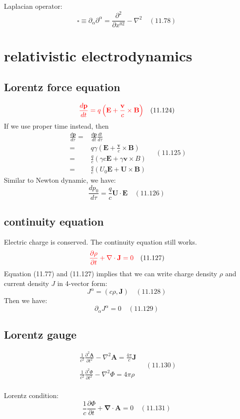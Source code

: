 \documentclass[10pt, oneside]{article}   	%
\begin{document}
\begin{multicols}{2}
Laplacian operator:\\
$$\square \equiv \partial_{\alpha} \partial^{\alpha}=\frac{\partial^{2}}{\partial x^{02}}-\nabla^{2}\quad(11.78)$$

\section{relativistic electrodynamics}
\subsection{Lorentz force equation}
$$\textcolor{red}{\frac{d \mathbf{p}}{d t}=q\left(\mathbf{E}+\frac{\mathbf{v}}{c} \times \mathbf{B}\right)}\quad(11.124)$$
If we use proper time instead, then\\
$$\begin{aligned}
\frac{d \mathbf{p}}{d \tau}=&\frac{d \mathbf{p}}{d t}\frac{d t}{d \tau}\\
=&q\gamma \left(\mathbf{E}+\frac{\mathbf{v}}{c} \times \mathbf{B}\right)\\
=&\frac{q}{c}(\gamma c \mathbf{E}+\gamma \mathbf{v}\times B)\\
=&\frac{q}{c}\left(U_{0} \mathbf{E}+\mathbf{U} \times \mathbf{B}\right)
\end{aligned}\quad(11.125)$$
Similar to Newton dynamic, we have:
$$\frac{d p_{0}}{d \tau}=\frac{q}{c} \mathbf{U} \cdot \mathbf{E}\quad(11.126)$$

\subsection{continuity equation}
Electric charge is conserved. The continuity equation still works.
$$\textcolor{red}{\frac{\partial \rho}{\partial t}+\nabla \cdot \mathbf{J}=0} \quad (11.127)$$
Equation (11.77) and (11.127) implies that we can write charge density $\rho$ and current density $J$ in 4-vector form:\\
$$J^\alpha=(c \rho, \mathbf{J})\quad(11.128)$$
Then we have:\\
$$\partial_{\alpha} J^{\alpha}=0\quad (11.129)$$

\subsection{Lorentz gauge}
$$\begin{array}{l}\frac{1}{c^{2}} \frac{\partial^{2} \mathbf{A}}{\partial t^{2}}-\nabla^{2} \mathbf{A}=\frac{4 \pi}{c} \mathbf{J} \\
\\
\frac{1}{c^{2}} \frac{\partial^{2} \Phi}{\partial t^{2}}-\nabla^{2} \Phi=4 \pi \rho
\end{array}\quad(11.130)$$
\\
Lorentz condition:\\
$$\frac{1}{c} \frac{\partial \Phi}{\partial t}+\mathbf{\nabla} \cdot \mathbf{A}=0\quad(11.131)$$


\end{multicols}
\end{document}

